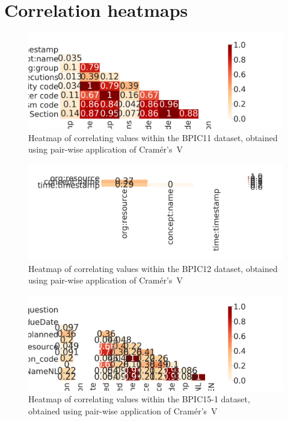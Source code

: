 \chapter{Correlation heatmaps}
\label{appendix:correlation-heatmaps}
\begin{figure}[ht!]
\centering
\includegraphics[width=\textwidth]{gfx/bpic2011/correlation-heatmap.png}
\caption{Heatmap of correlating values within the BPIC11 dataset, obtained using pair-wise application of Cramér's~V}
\label{fig:BPIC11-correlation-heatmap}
\end{figure}

\begin{figure}[ht!]
\centering
\includegraphics[width=\textwidth]{gfx/bpic2012/correlation-heatmap.png}
\caption{Heatmap of correlating values within the BPIC12 dataset, obtained using pair-wise application of Cramér's~V}
\label{fig:BPIC12-correlation-heatmap}
\end{figure}

\begin{figure}[ht!]
\centering
\includegraphics[width=\textwidth]{gfx/bpic2015_1/correlation-heatmap.png}
\caption{Heatmap of correlating values within the BPIC15-1 dataset, obtained using pair-wise application of Cramér's~V}
\label{fig:BPIC15-1-correlation-heatmap}
\end{figure}

